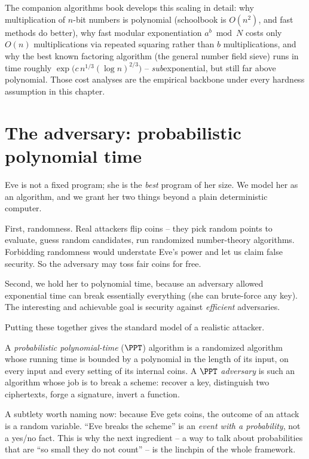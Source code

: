 \begin{connectionbox}
The companion algorithms book develops this scaling in detail: why multiplication of $n$-bit numbers is polynomial (schoolbook is $O(n^2)$, and fast methods do better), why fast modular exponentiation $a^b \bmod N$ costs only $O(n)$ multiplications via repeated squaring rather than $b$ multiplications, and why the best known factoring algorithm (the general number field sieve) runs in time roughly $\exp\!\big(c\,n^{1/3}(\log n)^{2/3}\big)$ -- \emph{sub}exponential, but still far above polynomial. Those cost analyses are the empirical backbone under every hardness assumption in this chapter.
\end{connectionbox}

\section{The adversary: probabilistic polynomial time}
\label{ch08:ppt}

Eve is not a fixed program; she is the \emph{best} program of her size. We model her as an algorithm, and we grant her two things beyond a plain deterministic computer.

First, randomness. Real attackers flip coins -- they pick random points to evaluate, guess random candidates, run randomized number-theory algorithms. Forbidding randomness would understate Eve's power and let us claim false security. So the adversary may toss fair coins for free.

Second, we hold her to polynomial time, because an adversary allowed exponential time can break essentially everything (she can brute-force any key). The interesting and achievable goal is security against \emph{efficient} adversaries.

Putting these together gives the standard model of a realistic attacker.

\begin{definition}
\label{ch08:def-ppt}
A \emph{probabilistic polynomial-time} ($\PPT$) algorithm is a randomized algorithm whose running time is bounded by a polynomial in the length of its input, on every input and every setting of its internal coins. A $\PPT$ \emph{adversary} is such an algorithm whose job is to break a scheme: recover a key, distinguish two ciphertexts, forge a signature, invert a function.
\end{definition}

A subtlety worth naming now: because Eve gets coins, the outcome of an attack is a random variable. ``Eve breaks the scheme'' is an \emph{event with a probability}, not a yes/no fact. This is why the next ingredient -- a way to talk about probabilities that are ``so small they do not count'' -- is the linchpin of the whole framework.

